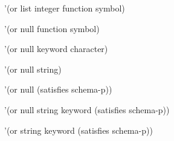\begin{group}
\begin{description}
\item[] '(or list integer function symbol)

\item[] '(or null function symbol)

\item[] '(or null keyword character)

\item[] '(or null string)

\item[] '(or null (satisfies schema-p))

\item[] '(or null string keyword (satisfies schema-p))

\item[] '(or string keyword (satisfies schema-p))

\end{description}
\end{group}





